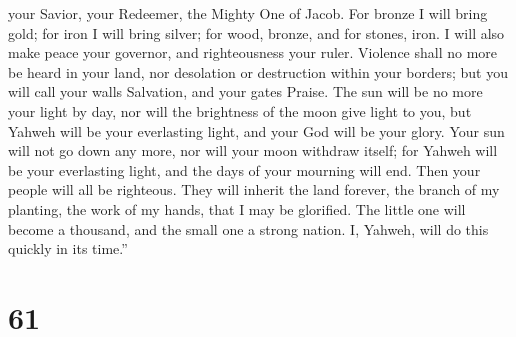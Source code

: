 your Savior, your Redeemer, the Mighty One of Jacob.  For
bronze I will bring gold; for iron I will bring silver; for wood,
bronze, and for stones, iron. I will also make peace your governor, and
righteousness your ruler.  Violence shall no more be heard
in your land, nor desolation or destruction within your borders; but you
will call your walls Salvation, and your gates Praise.  The
sun will be no more your light by day, nor will the brightness of the
moon give light to you, but Yahweh will be your everlasting light, and
your God will be your glory.  Your sun will not go down any
more, nor will your moon withdraw itself; for Yahweh will be your
everlasting light, and the days of your mourning will end. 
Then your people will all be righteous. They will inherit the land
forever, the branch of my planting, the work of my hands, that I may be
glorified.  The little one will become a thousand, and the
small one a strong nation. I, Yahweh, will do this quickly in its
time.''

\hypertarget{section-57}{%
\section{61}\label{section-57}}

